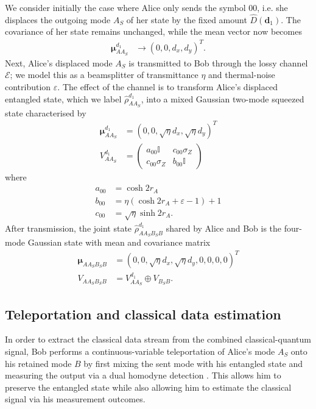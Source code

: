 \documentclass[%
 reprint,
 superscriptaddress,
 amsmath,
 amssymb,
 aps,
 pra,
]{revtex4-2}
\newcommand{\id}{\mathbb{I}}
\newcommand{\sz}{\sigma_Z}
\newcommand{\e}{\varepsilon}
\begin{document}
We consider initially the case where Alice only sends the symbol $00$, i.e. she displaces the outgoing mode $A_S$ of her state by the fixed amount $\hat D(\bm{d}_1)$. The covariance of her state remains unchanged, while the mean vector now becomes
\begin{align}
    \bm{\mu}_{AA_S}^{d_1} &\longrightarrow (0, 0, d_x, d_y)^T.
\end{align}
Next, Alice's displaced mode $A_S$ is transmitted to Bob through the lossy channel $\mathcal{E}$; we model this as a beamsplitter of transmittance $\eta$ and thermal-noise contribution $\e$. The effect of the channel is to transform Alice's displaced entangled state, which we label $\hat \rho_{AA_S}^{d_1}$, into a mixed Gaussian two-mode squeezed state characterised by
\begin{align}
    \bm{\mu}_{AA_S}^{d_1} &= (0, 0, \sqrt{\eta} d_x, \sqrt{\eta} d_y)^T \\
    V_{AA_S}^{d_1} &= \begin{pmatrix}
        a_{00} \id & c_{00} \sz \\
        c_{00} \sz & b_{00} \id
    \end{pmatrix}
\end{align}
where
\begin{align}
    a_{00} &= \cosh 2r_A \\
    b_{00} &= \eta(\cosh 2r_A + \e - 1) + 1 \\
    c_{00} &= \sqrt{\eta} \sinh 2r_A.
\end{align}
After transmission, the joint state $\hat \rho_{AA_SB_SB}^{d_1}$ shared by Alice and Bob is the four-mode Gaussian state with mean and covariance matrix
\begin{align}
    \bm{\mu}_{AA_SB_SB} &= (0, 0, \sqrt{\eta} d_x, \sqrt{\eta} d_y, 0, 0, 0, 0)^T \\
    V_{AA_SB_SB} &= V_{AA_S}^{d_1} \oplus V_{B_SB}.
\end{align}

\subsection{Teleportation and classical data estimation}
In order to extract the classical data stream from the combined classical-quantum signal, Bob performs a continuous-variable teleportation of Alice's mode $A_S$ onto his retained mode $B$ by first mixing the sent mode with his entangled state and measuring the output via a dual homodyne detection \cite{braunstein_quantum_2005}. This allows him to preserve the entangled state while also allowing him to estimate the classical signal via his measurement outcomes.
\end{document}
